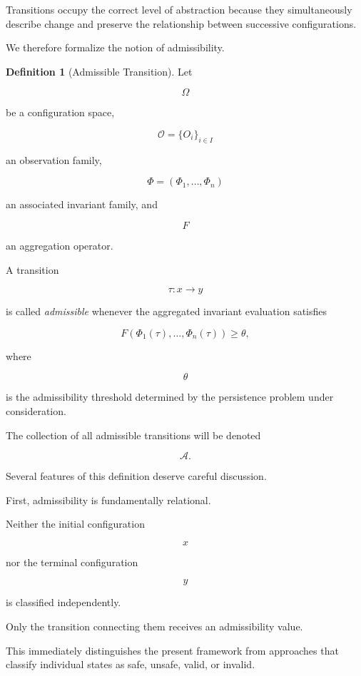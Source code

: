 \documentclass[11pt]{book}
\numberwithin{equation}{chapter}
\theoremstyle{definition}
\newtheorem{definition}{Definition}[chapter]
\theoremstyle{plain}
\begin{document}
Transitions occupy the correct level of abstraction because they simultaneously describe change and preserve the relationship between successive configurations.

We therefore formalize the notion of admissibility.

\begin{definition}[Admissible Transition]

Let

\[
\Omega
\]

be a configuration space,

\[
\mathcal{O}
=
\{O_i\}_{i\in I}
\]

an observation family,

\[
\Phi
=
(\Phi_1,\ldots,\Phi_n)
\]

an associated invariant family, and

\[
F
\]

an aggregation operator.

A transition

\[
\tau:x\longrightarrow y
\]

is called \emph{admissible} whenever the aggregated invariant evaluation satisfies

\[
F\!\left(
\Phi_1(\tau),
\ldots,
\Phi_n(\tau)
\right)
\geq
\theta,
\]

where

\[
\theta
\]

is the admissibility threshold determined by the persistence problem under consideration.

The collection of all admissible transitions will be denoted

\[
\mathcal{A}.
\]

\end{definition}

Several features of this definition deserve careful discussion.

First, admissibility is fundamentally relational.

Neither the initial configuration

\[
x
\]

nor the terminal configuration

\[
y
\]

is classified independently.

Only the transition connecting them receives an admissibility value.

This immediately distinguishes the present framework from approaches that classify individual states as safe, unsafe, valid, or invalid.
\end{document}
